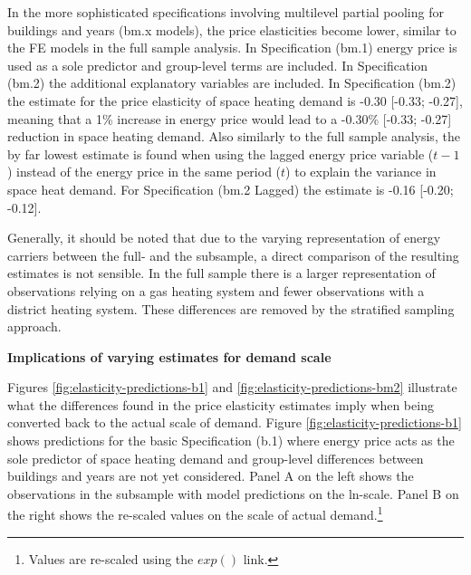 \documentclass[12pt,twoside]{reedthesis}
\begin{document}
In the more sophisticated specifications involving multilevel partial pooling for buildings and years (bm.x models), the price elasticities become lower, similar to the FE models in the full sample analysis. In Specification (bm.1) energy price is used as a sole predictor and group-level terms are included. In Specification (bm.2) the additional explanatory variables are included. In Specification (bm.2) the estimate for the price elasticity of space heating demand is -0.30 {[}-0.33; -0.27{]}, meaning that a 1\% increase in energy price would lead to a -0.30\% {[}-0.33; -0.27{]} reduction in space heating demand. Also similarly to the full sample analysis, the by far lowest estimate is found when using the lagged energy price variable (\(t-1\)) instead of the energy price in the same period (\(t\)) to explain the variance in space heat demand. For Specification (bm.2 Lagged) the estimate is -0.16 {[}-0.20; -0.12{]}.

Generally, it should be noted that due to the varying representation of energy carriers between the full- and the subsample, a direct comparison of the resulting estimates is not sensible. In the full sample there is a larger representation of observations relying on a gas heating system and fewer observations with a district heating system. These differences are removed by the stratified sampling approach.

\textbf{Implications of varying estimates for demand scale}

Figures \ref{fig:elasticity-predictions-b1} and \ref{fig:elasticity-predictions-bm2} illustrate what the differences found in the price elasticity estimates imply when being converted back to the actual scale of demand. Figure \ref{fig:elasticity-predictions-b1} shows predictions for the basic Specification (b.1) where energy price acts as the sole predictor of space heating demand and group-level differences between buildings and years are not yet considered. Panel A on the left shows the observations in the subsample with model predictions on the ln-scale. Panel B on the right shows the re-scaled values on the scale of actual demand.\footnote{Values are re-scaled using the \(exp()\) link.}
\end{document}
